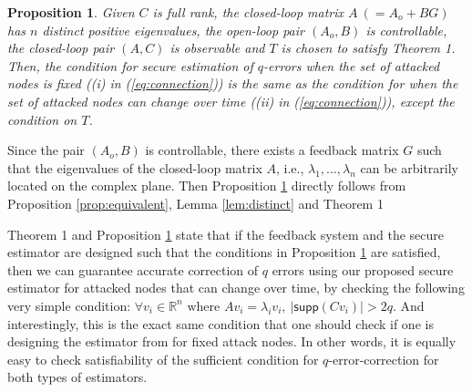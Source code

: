 \documentclass[twocolumn]{autart}    %
\newtheorem{Prop}{\bf{Proposition}}
\newcommand{\rev}[1]{{\normalsize{{{\color{blue}#1}}}}}
\begin{document}
\begin{Prop}\label{prop:equivalent2}
Given $C$ is full rank, the closed-loop matrix $A~(=A_o+BG)$ has $n$ distinct positive eigenvalues, the open-loop pair $(A_o,B)$ is controllable, the closed-loop pair $(A,C)$ is observable and $T$ is chosen to satisfy Theorem 1. Then, the condition for secure estimation of $q$-errors when the set of attacked nodes is fixed ((i) in (\ref{eq:connection})) is the same as the condition for when the set of attacked nodes can change over time ((ii) in (\ref{eq:connection})), except the condition on $T$.
\end{Prop}
\vspace{-0.6cm}
\begin{pf}
Since the pair $(A_o,B)$ is controllable, there exists a feedback matrix $G$ such that the eigenvalues of the closed-loop matrix $A$, i.e., $\lambda_1, ..., \lambda_n$ can be arbitrarily located on the complex plane. Then Proposition \ref{prop:equivalent2} directly follows from Proposition \ref{prop:equivalent}, Lemma \ref{lem:distinct} and Theorem 1 
\end{pf}
\vspace{-0.6cm}
\rev{
Theorem 1 and Proposition \ref{prop:equivalent2} state that if the feedback system and the secure \rev{estimator} are designed such that the conditions in Proposition \ref{prop:equivalent2} are satisfied, then we can guarantee accurate correction of $q$ errors using our proposed secure \rev{estimator} for attacked nodes that can change over time, by checking the following very simple condition:
$ %
\forall v_i \in \mathbb{R}^n \text{ where } Av_i =\lambda_i v_i, ~ \lvert \textsf{supp}(Cv_i) \rvert > 2q.  \nonumber
$ %
And interestingly, this is the exact same condition that one should check if one is designing the \rev{estimator} from \cite{Fawzi2014} for fixed attack nodes. In other words, it is equally easy to check satisfiability of the sufficient condition for $q$-error-correction for both types of \rev{estimators}.}
\vspace{-0.4cm}
\end{document}

